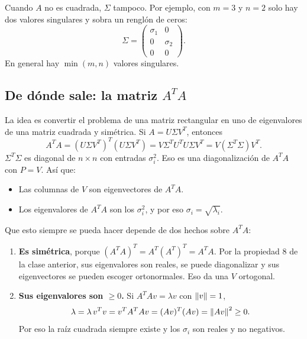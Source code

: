 \documentclass[11pt,letterpaper]{article}
\begin{document}
Cuando $A$ no es cuadrada, $\Sigma$ tampoco. Por ejemplo, con
$m = 3$ y $n = 2$ solo hay dos valores singulares y sobra un renglón
de ceros:
\[
    \Sigma = \begin{pmatrix} \sigma_1 & 0 \\ 0 & \sigma_2 \\ 0 & 0
    \end{pmatrix} .
\]
En general hay $\min(m, n)$ valores singulares.


\subsection*{De dónde sale: la matriz $A^{T}A$}

La idea es convertir el problema de una matriz rectangular en uno de
eigenvalores de una matriz cuadrada y simétrica. Si $A = U\Sigma V^{T}$,
entonces
\[
    A^{T}A = (U\Sigma V^{T})^{T}(U\Sigma V^{T})
           = V\Sigma^{T}U^{T}U\Sigma V^{T}
           = V (\Sigma^{T}\Sigma) V^{T} .
\]
$\Sigma^{T}\Sigma$ es diagonal de $n \times n$ con entradas
$\sigma_i^2$. Eso es una diagonalización de $A^{T}A$ con $P = V$. Así
que:

\begin{itemize}[itemsep=0.3em]
    \item Las columnas de $V$ son eigenvectores de $A^{T}A$.
    \item Los eigenvalores de $A^{T}A$ son los $\sigma_i^2$, y por
          eso $\sigma_i = \sqrt{\lambda_i}$.
\end{itemize}

Que esto siempre se pueda hacer depende de dos hechos sobre $A^{T}A$:

\begin{enumerate}[itemsep=0.3em]
    \item \textbf{Es simétrica}, porque
          $(A^{T}A)^{T} = A^{T}(A^{T})^{T} = A^{T}A$. Por la propiedad
          8 de la clase anterior, sus eigenvalores son reales, se
          puede diagonalizar y sus eigenvectores se pueden escoger
          ortonormales. Eso da una $V$ ortogonal.
    \item \textbf{Sus eigenvalores son $\geq 0$.} Si
          $A^{T}Av = \lambda v$ con $\left\lVert v \right\rVert = 1$,
          \[
              \lambda = \lambda\, v^{T}v = v^{T}A^{T}Av
                      = (Av)^{T}(Av) = \left\lVert Av \right\rVert^2 \geq 0 .
          \]
          Por eso la raíz cuadrada siempre existe y los $\sigma_i$
          son reales y no negativos.
\end{enumerate}
\end{document}
